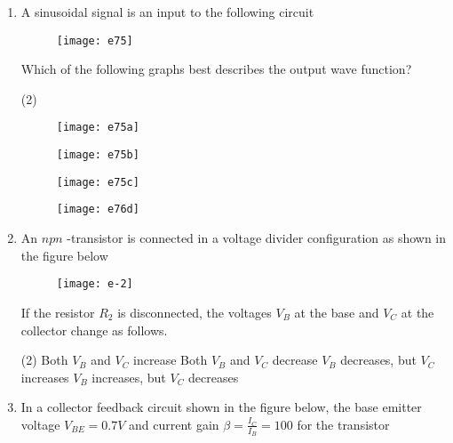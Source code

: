 \begin{enumerate}
\begin{figure}[H]
	\end{figure}
	The base current $I_{B}$ is
	{	}
	\begin{tasks}(4)
		\task[\textbf{A.}] $40 \mu A$
		\task[\textbf{B.}] $30 \mu A$
		\task[\textbf{C.}] $44 \mu A$
		\task[\textbf{D.}] $33 \mu A$
	\end{tasks}
	\item A sinusoidal signal is an input to the following circuit\\
	\begin{figure}[H]
		\centering
		\texttt{[image: e75]}
	\end{figure}
	Which of the following graphs best describes the output wave function?
	{	}
	\begin{tasks}(2)
		\task[\textbf{A.}] \begin{figure}[H]
			\centering
			\texttt{[image: e75a]}
		\end{figure}
		\task[\textbf{B.}] \begin{figure}[H]
			\centering
			\texttt{[image: e75b]}
		\end{figure}
		\task[\textbf{C.}] \begin{figure}[H]
			\centering
			\texttt{[image: e75c]}
		\end{figure}
		\task[\textbf{D.}] \begin{figure}[H]
			\centering
			\texttt{[image: e76d]}
		\end{figure}
	\end{tasks}
	\item An $npn$ -transistor is connected in a voltage divider configuration as shown in the figure below\\
	\begin{figure}[H]
		\centering
		\texttt{[image: e-2]}
	\end{figure}
	If the resistor $R_{2}$ is disconnected, the voltages $V_{B}$ at the base and $V_{C}$ at the collector change as follows.
	{	}
	\begin{tasks}(2)
		\task[\textbf{A.}]  Both $V_{B}$ and $V_{C}$ increase
		\task[\textbf{B.}] Both $V_{B}$ and $V_{C}$ decrease
		\task[\textbf{C.}]  $V_{B}$ decreases, but $V_{C}$ increases
		\task[\textbf{D.}] $V_{B}$ increases, but $V_{C}$ decreases
	\end{tasks}
	\item In a collector feedback circuit shown in the figure below, the base emitter voltage $V_{B E}=0.7 V$ and current gain $\beta=\frac{I_{C}}{I_{B}}=100$ for the transistor\\

\end{enumerate}
